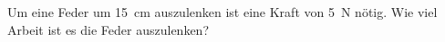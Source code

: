
\begin{aufgabe}
	Um eine Feder um \SI{15}{cm} auszulenken ist eine Kraft von \SI{5}{N} nötig.
	Wie viel Arbeit ist es die Feder auszulenken?
\end{aufgabe}
